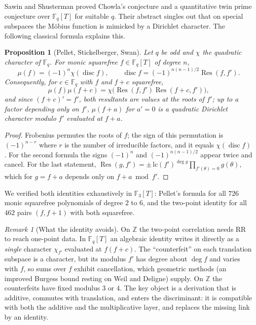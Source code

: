 \documentclass[11pt]{amsart}
\newtheorem{proposition}[theorem]{Proposition}
\theoremstyle{definition}
\theoremstyle{remark}
\newtheorem{remark}[theorem]{Remark}
\newcommand{\Z}{\mathbb{Z}}
\newcommand{\F}{\mathbb{F}}
\newcommand{\Res}{\operatorname{Res}}
\newcommand{\disc}{\operatorname{disc}}
\begin{document}
Sawin and Shusterman \cite{SS22} proved Chowla's conjecture and a quantitative twin prime conjecture over $\F_q[T]$ for suitable $q$. Their abstract singles out that on special subspaces the Möbius function is mimicked by a Dirichlet character. The following classical formula explains this.

\begin{proposition}[Pellet, Stickelberger, Swan]\label{prop:pellet}
Let $q$ be odd and $\chi$ the quadratic character of $\F_q$. For monic squarefree $f\in\F_q[T]$ of degree $n$,
\[
\mu(f)=(-1)^n\chi(\disc f),\qquad \disc f=(-1)^{n(n-1)/2}\Res(f,f').
\]
Consequently, for $c\in\F_q$ with $f$ and $f+c$ squarefree,
\[
\mu(f)\mu(f+c)=\chi\bigl(\Res(f,f')\Res(f+c,f')\bigr),
\]
and since $(f+c)'=f'$, both resultants are values at the roots of $f'$; up to a factor depending only on $f'$, $\mu(f+a)$ for $a'=0$ is a quadratic Dirichlet character modulo $f'$ evaluated at $f+a$.
\end{proposition}

\begin{proof}
Frobenius permutes the roots of $f$; the sign of this permutation is $(-1)^{n-r}$ where $r$ is the number of irreducible factors, and it equals $\chi(\disc f)$. For the second formula the signs $(-1)^n$ and $(-1)^{n(n-1)/2}$ appear twice and cancel. For the last statement, $\Res(g,f')=\pm\,\mathrm{lc}(f')^{\deg g}\prod_{f'(\theta)=0}g(\theta)$, which for $g=f+a$ depends only on $f+a\bmod f'$.
\end{proof}

We verified both identities exhaustively in $\F_3[T]$: Pellet's formula for all $726$ monic squarefree polynomials of degree $2$ to $6$, and the two-point identity for all $462$ pairs $(f,f+1)$ with both squarefree.

\begin{remark}[What the identity avoids]
On $\Z$ the two-point correlation needs RR to reach one-point data. In $\F_q[T]$ an algebraic identity writes it directly as a \emph{single} character $\chi_{f'}$ evaluated at $f(f+c)$. The ``counterfeit'' on each translation subspace is a character, but its modulus $f'$ has degree about $\deg f$ and varies with $f$, so sums over $f$ exhibit cancellation, which geometric methods (an improved Burgess bound resting on Weil and Deligne) supply. On $\Z$ the counterfeits have fixed modulus $3$ or $4$. The key object is a derivation that is additive, commutes with translation, and enters the discriminant: it is compatible with both the additive and the multiplicative layer, and replaces the missing link by an identity.
\end{remark}
\end{document}
